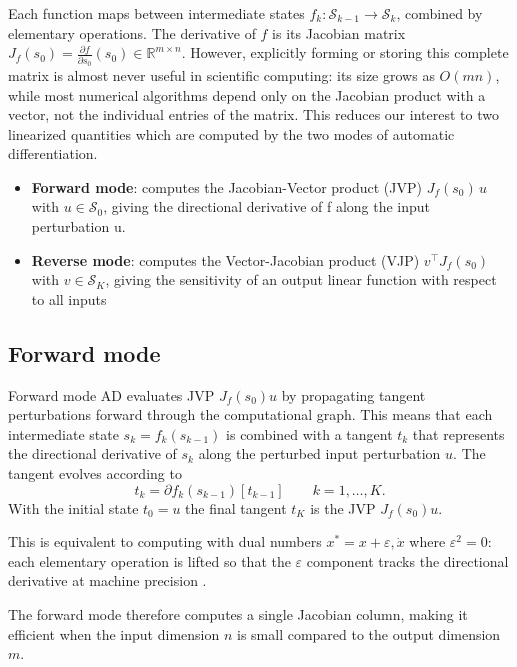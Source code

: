 Each function maps between intermediate states $f_k: \mathcal{S}_{k-1} \to \mathcal{S}_k$, combined by elementary operations. The derivative of $f$ is its Jacobian matrix $J_f(s_0) = \frac{\partial f}{\partial s_0}(s_0) \in \mathbb{R}^{m\times n}$. However, explicitly forming or storing this complete matrix is almost never useful in scientific computing: its size grows as $O(mn)$, while most numerical algorithms depend only on the Jacobian product with a vector, not the individual entries of the matrix. This reduces our interest to two linearized quantities which are computed by the two modes of automatic differentiation.

\begin{itemize}
    \item \textbf{Forward mode}: computes the Jacobian-Vector product (JVP) $J_f(s_0)\,u$ with $u\in\mathcal{S}_0$, giving the directional derivative of f along the input perturbation u.
    \item \textbf{Reverse mode}: computes the Vector-Jacobian product (VJP) $v^\top J_f(s_0)$ with $v\in\mathcal{S}_K$, giving the sensitivity of an output linear function with respect to all inputs
\end{itemize}

\subsection{Forward mode}

Forward mode AD evaluates JVP $J_f(s_0)u$ by propagating tangent perturbations forward through the computational graph. This means that each intermediate state $s_k = f_k(s_{k-1})$ is combined with a tangent $t_k$ that represents the directional derivative of $s_k$ along the perturbed input perturbation $u$. The tangent evolves according to 
\[
 t_k = \partial f_k(s_{k-1}) [t_{k-1}]
\qquad k = 1, \dots, K.
\]
With the initial state $t_0 = u$ the final tangent $t_K$ is the JVP $J_f(s_0)u$. 

This is equivalent to computing with dual numbers $x^{*} =x+\varepsilon, \dot x$ where $\varepsilon^2 =0$: each elementary operation is lifted so that the $\varepsilon$ component tracks the directional derivative at machine precision \parencite{baydin_automatic_2015}.

The forward mode therefore computes a single Jacobian column, making it efficient when the input dimension $n$ is small compared to the output dimension $m$.

